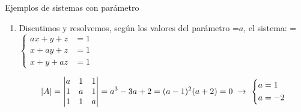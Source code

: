\documentclass[11pt,a4paper]{article}
\newcommand{\fmm}[1]{\setbox0=\hbox{$#1$}\ifdim\wd0>\linewidth\fmdisp{#1}\else\mbox{\box0}\fi}
\newcommand{\fmdisp}[1]{\[\setbox2=\hbox{$\displaystyle #1$}\ifdim\wd2>\linewidth\resizebox{\linewidth}{!}{\box2}\else\box2\fi\]}
\newcommand{\fmbadge}[2]{\tcbox[on line,colback=#1,colframe=#1,arc=2mm,boxsep=0pt,left=4pt,right=4pt,top=1.5pt,bottom=1.5pt]{\color{white}\footnotesize\bfseries #2}}
\begin{document}
\begin{fmex}{Ejemplos de sistemas con parámetro}
\begin{enumerate}[label=\textbf{\arabic*.},leftmargin=*]
\fmdisp{A^*\xrightarrow[F_3'=F_3-F_1]{F_2'=F_2+2F_1}\left(\begin{array}{rrr|r}-1 & 1 & 1 & 2\\ 0 & 1 & 4 & 4\\ 0 & -1 & -4 & -4\end{array}\right)\xrightarrow{F_3''=F_3'+F_2'}\left(\begin{array}{rrr|r}-1 & 1 & 1 & 2\\ 0 & 1 & 4 & 4\\ 0 & 0 & 0 & 0\end{array}\right)}

\fmdisp{z=\lambda\ \rightarrow\ y=4-4\lambda\ \rightarrow\ -x+(4-4\lambda)+\lambda=2\ \rightarrow\ x=2-3\lambda}

\fmdisp{\boxed{x=2-3\lambda;\ \ y=4-4\lambda;\ \ z=\lambda,\quad\lambda\in\mathbb{R}}}

\textbf{Si \fmm{m\neq1}} \fmm{\rightarrow\operatorname{rg}(A)=3=\operatorname{rg}(A^*)=} n.º de incógnitas \fmm{\rightarrow} \fmbadge{fmok}{SCD}. Lo resolvemos por Cramer:

\fmdisp{x=\frac{\begin{vmatrix}2 & m & 1\\ 0 & -1 & 2\\ -2 & 0 & -3\end{vmatrix}}{4m-4}=\frac{-4m+4}{4m-4}=-1;\quad y=\frac{\begin{vmatrix}-1 & 2 & 1\\ 2 & 0 & 2\\ -1 & -2 & -3\end{vmatrix}}{4m-4}=\frac{0}{4m-4}=0;\quad z=\frac{\begin{vmatrix}-1 & m & 2\\ 2 & -1 & 0\\ -1 & 0 & -2\end{vmatrix}}{4m-4}=\frac{4m-4}{4m-4}=1}

\fmdisp{\boxed{x=-1;\ \ y=0;\ \ z=1}}

\item Discutimos y resolvemos, según los valores del parámetro \fmm{a}, el sistema: \fmm{\left\{\begin{aligned}ax+y+z&=1\\ x+ay+z&=1\\ x+y+az&=1\end{aligned}\right.}

\fmdisp{|A|=\begin{vmatrix}a & 1 & 1\\ 1 & a & 1\\ 1 & 1 & a\end{vmatrix}=a^3-3a+2=(a-1)^2(a+2)=0\ \rightarrow\ \left\{\begin{aligned}a&=1\\ a&=-2\end{aligned}\right.}


\end{enumerate}
\end{fmex}
\end{document}
